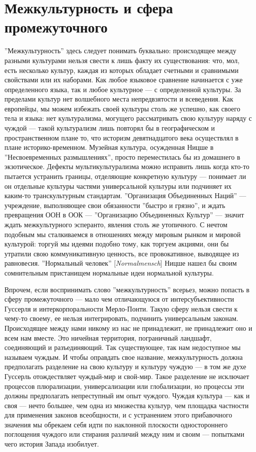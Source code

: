 \documentclass[12pt]{book}
\begin{document}
\section{Межкультурность и сфера промежуточного}

''Межкультурность'' здесь следует понимать буквально: происходящее между разными культурами нельзя свести к лишь факту их существования: что, мол, есть несколько культур, каждая из которых обладает счетными и сравнимыми свойствами или их наборами. Как любое языковое сравнение начинается с уже определенного языка, так и любое культурное --- с определенной культуры. За пределами культур нет волшебного места непредвзятости и всеведения. Как европейцы, мы можем избежать своей культуры столь же успешно, как своего тела и языка: нет культурализма, могущего рассматривать свою культуру наряду с чуждой --- такой культурализм лишь повторял бы в географическом и пространственном плане то, что историзм девятнадцатого века осуществлял в плане историко-временном. Музейная культура, осужденная Ницше в ''Несвоевременных размышлениях'', просто переместилась бы из домашнего в экзотическое. Дефекты мультикультурализма можно исправить лишь когда кто-то пытается устранить границы, отделяющие конкретную культуру --- понимает ли он отдельные культуры частями универсальной культуры или подчиняет их каким-то транскультурным стандартам. ''Организация Объединенных Наций'' --- учреждение, выполняющее свои обязанности ''быстро и грязно'', и ждать превращения ООН в ООК --- ''Организацию Объединенных Культур'' --- значит ждать межкультурного эсперанто, явления столь же утопичного. С нечтом подобным мы сталкиваемся в отношениях между мировым рынком и мировой культурой: торгуй мы идеями подобно тому, как торгуем акциями, они бы утратили свою коммуникативную ценность, все провокативное, выводящее из равновесия. ''Нормальный человек'' [\textit{Normalmensch}] Ницше нашел бы своим сомнительным пристанищем нормальные идеи нормальной культуры.

Впрочем, если воспринимать слово ''межкультурность'' всерьез, можно попасть в сферу промежуточного --- мало чем отличающуюся от интерсубъективности Гуссерля и интеркорпоральности Мерло-Понти. Такую сферу нельзя свести к чему-то своему, ее нельзя интегрировать, подчинить универсальным законам. Происходящее между нами никому из нас не принадлежит, не принадлежит оно и всем нам вместе. Это ничейная территория, пограничный ландшафт, соединяющий и разъединяющий. Так существующее, так нам недоступное мы называем чуждым. И чтобы оправдать свое название, межкультурность должна предполагать разделение на свою культуру и культуру чуждую --- в том же духе Гуссерль отождествляет чуждый-мир и свой-мир. Такое разделение не исключает процессов плюрализации, универсализации или глобализации, но процессы эти должны предполагать непреступный им опыт чуждого. Чуждая культура --- как и своя --- нечто большее, чем одна из множества культур, чем площадка частности для применения законов всеобщности, и с устранением этого прибавочного значения мы обрекаем себя идти по наклонной плоскости одностороннего поглощения чуждого или стирания различий между ним и своим --- попытками чего история Запада изобилует.
\end{document}
